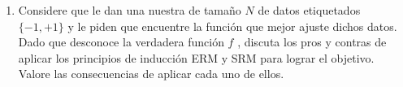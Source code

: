 \documentclass[12pt,a4paper]{article}
\begin{document}
\begin{enumerate}
\item Considere que le dan una nuestra de tamaño $N$ de datos etiquetados $\{-1, +1\}$ y le piden que encuentre la función que mejor ajuste dichos datos. Dado que desconoce la verdadera
función $f$ , discuta los pros y contras de aplicar los principios de inducción ERM y SRM para lograr el objetivo. Valore las consecuencias de aplicar cada uno de ellos.
\end{enumerate}
\clearpage


\end{document}
